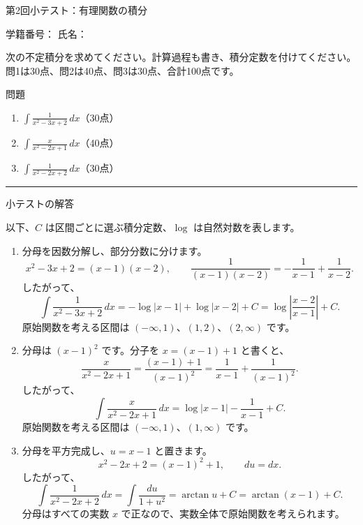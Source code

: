 \documentclass[a4paper,10pt,dvipdfmx]{jsarticle}
\renewcommand{\handout}[2]{%
  \def\handoutnumber{第#1回}%
  \begin{center}
    {\Large\normalfont\mdseries\color{ink}第#1回\quad #2}\par
    \vspace{2pt}{\color{accent}\rule{0.88\linewidth}{1.2pt}}
  \end{center}\vspace{2pt}}
\renewcommand{\topic}[1]{\par\vspace{5pt}%
  {\large\normalfont\mdseries\color{accent}#1}\par\vspace{1pt}}
\begin{document}
\pagestyle{empty}
\handout{2}{小テスト：有理関数の積分}

学籍番号：\underline{\hspace{40mm}}\hfill
氏名：\underline{\hspace{40mm}}

次の不定積分を求めてください。計算過程も書き、積分定数を付けてください。
問1は30点、問2は40点、問3は30点、合計100点です。

\topic{問題}
\begin{enumerate}[label=\color{accent}\arabic*.,leftmargin=2.4em,itemsep=9pt]
\item $\displaystyle\int\frac{1}{x^2-3x+2}\,dx$\hfill（30点）

\item $\displaystyle\int\frac{x}{x^2-2x+1}\,dx$\hfill（40点）

\item $\displaystyle\int\frac{1}{x^2-2x+2}\,dx$\hfill（30点）
\end{enumerate}

\par\vspace{4mm}
{\color{accent}\rule{\linewidth}{0.6pt}}
\topic{小テストの解答}
以下、$C$ は区間ごとに選ぶ積分定数、$\log$ は自然対数を表します。

\begin{enumerate}[label=\color{accent}\arabic*.,leftmargin=2.4em,itemsep=9pt]
\item 分母を因数分解し、部分分数に分けます。
$$
 x^2-3x+2=(x-1)(x-2),\qquad
 \frac1{(x-1)(x-2)}=-\frac1{x-1}+\frac1{x-2}.
$$
したがって、
$$
 \int\frac{1}{x^2-3x+2}\,dx
 =-\log|x-1|+\log|x-2|+C
 =\log\left|\frac{x-2}{x-1}\right|+C.
$$
原始関数を考える区間は $(-\infty,1)$、$(1,2)$、$(2,\infty)$ です。

\item 分母は $(x-1)^2$ です。分子を $x=(x-1)+1$ と書くと、
$$
 \frac{x}{x^2-2x+1}
 =\frac{(x-1)+1}{(x-1)^2}
 =\frac1{x-1}+\frac1{(x-1)^2}.
$$
したがって、
$$
 \int\frac{x}{x^2-2x+1}\,dx
 =\log|x-1|-\frac1{x-1}+C.
$$
原始関数を考える区間は $(-\infty,1)$、$(1,\infty)$ です。

\item 分母を平方完成し、$u=x-1$ と置きます。
$$
 x^2-2x+2=(x-1)^2+1,\qquad du=dx.
$$
したがって、
$$
 \int\frac{1}{x^2-2x+2}\,dx
 =\int\frac{du}{1+u^2}
 =\arctan u+C
 =\arctan(x-1)+C.
$$
分母はすべての実数 $x$ で正なので、実数全体で原始関数を考えられます。
\end{enumerate}
\end{document}
